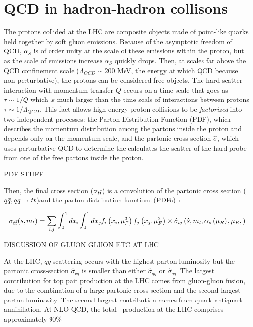 \section{QCD in hadron-hadron collisons}
The protons collided at the LHC are composite objects made of point-like quarks held together by soft gluon emissions. Because of the asymptotic freedom of QCD, $\alpha_S$ is of order unity at the scale of these emissions within the proton, but as the scale of emissions increase $\alpha_S$ quickly drops. Then, at scales far above the QCD confinement scale ($\Lambda_{QCD} \sim 200$ MeV, the energy at which QCD because non-perturbative), the protons can be considered free objects. The hard scatter interaction with momentum transfer $Q$ occurs on a time scale that goes as $\tau \sim 1/Q$ which is much larger than the time scale of interactions between protons $\tau \sim 1/\Lambda_{QCD}$. This fact allows high energy proton collisions to be \textit{factorized} into two independent processes: the Parton Distribution Function (PDF), which describes the momentum distribution among the partons inside the proton and depends only on the momentum scale, and the partonic cross section $\hat{\sigma}$, which uses perturbative QCD to determine the calculates the scatter of the hard probe from one of the free partons inside the proton.

PDF STUFF

Then, the final \ttbar  cross section ($\sigma_{t\bar{t}}$) is a convolution of the partonic cross section ($q\bar{q}, qq \rightarrow t\bar{t}$)and the parton distribution functions (PDFs)~\cite{Moch:2008qy}:

\begin{equation}
\sigma_{t\bar{t}}(s, m_{t}) = \sum_{i, j} \int^1_0 dx_i  \int^1_0 dx_j f_i \left(x_i, \mu_F^2 \right) f_j\left(x_j, \mu_F^2 \right) \times \hat{\sigma}_{ij} \left( \hat{s}, m_{t}, \alpha_s \left(\mu_R \right), \mu_R,  \right)
\end{equation}

DISCUSSION OF GLUON GLUON ETC AT LHC

At the LHC, $qg$ scattering occurs with the highest parton luminosity but the partonic cross-section $\hat{\sigma}_{qg}$ is smaller than either $\hat{\sigma}_{gg}$ or $\hat{\sigma}_{qq}$. The largest contribution for top pair production at the LHC comes from gluon-gluon fusion, due to the combination of a large partonic cross-section and the second largest parton luminosity. The second largest contribution comes from quark-antiquark annihilation. At NLO QCD, the total \ttbar\ production at the LHC comprises approximately 90\%

